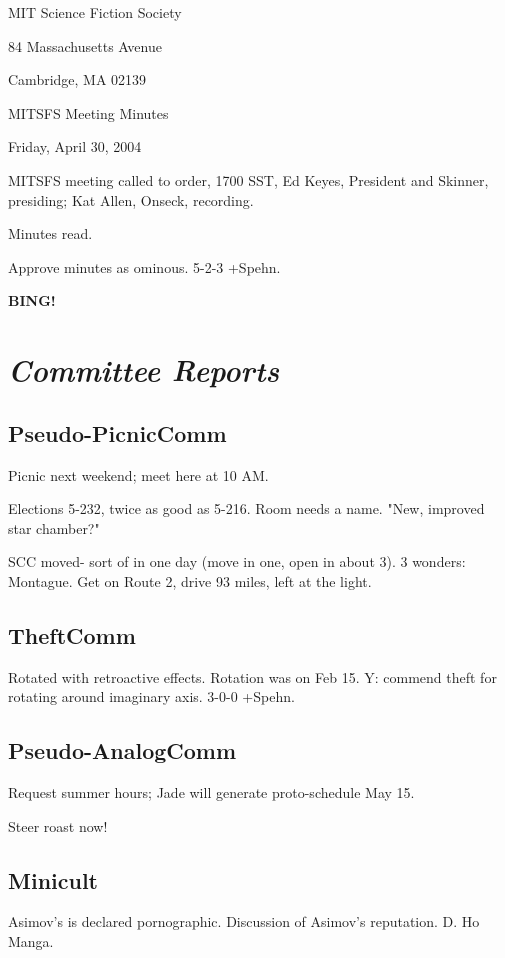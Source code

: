 \documentclass[10pt]{article}
\newcommand{\bing}{{\bf BING!} }
\newcommand{\goto}[1]{\bing \vskip 12pt \section*{{\em{#1}}}}
\begin{document}
\begin{center}

MIT Science Fiction Society 

84 Massachusetts Avenue

Cambridge, MA 02139

\vspace{12pt}

MITSFS Meeting Minutes 

Friday, April 30, 2004


\end{center}
 
\vspace{18pt}

\setlength{\parskip}{6pt}

\noindent
MITSFS meeting called to order, 1700 SST, Ed Keyes, President and
Skinner, presiding; Kat Allen,  Onseck, recording.

Minutes read.

Approve minutes as ominous. 5-2-3 +Spehn.

\goto{Committee Reports}

\subsection*{Pseudo-PicnicComm}
Picnic next weekend; meet here at 10 AM.

Elections 5-232, twice as good as 5-216. Room needs a name. "New, improved star chamber?"

SCC moved- sort of in one day (move in one, open in about 3). 3 wonders: Montague. Get on Route 2, drive 93 miles, left at the light.

\subsection*{TheftComm}
Rotated with retroactive effects. Rotation was on Feb 15. Y: commend theft for rotating around imaginary axis. 3-0-0 +Spehn.

\subsection*{Pseudo-AnalogComm}
Request summer hours; Jade will generate proto-schedule May 15.

Steer roast now!

\subsection*{Minicult}
Asimov's is declared pornographic. Discussion of Asimov's reputation. D. Ho Manga.
\end{document}
